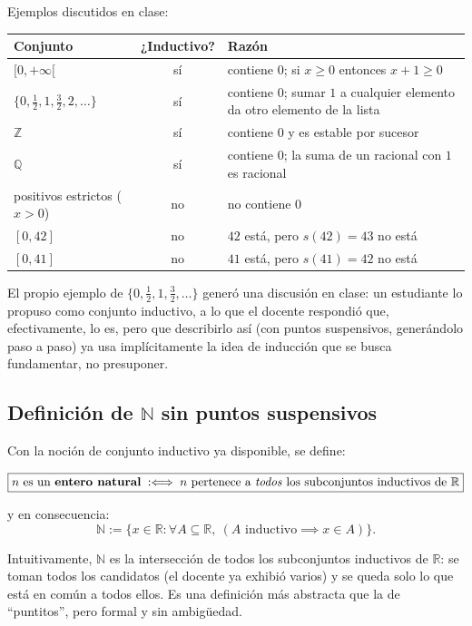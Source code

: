 \documentclass[12pt,a4paper]{article}
\begin{document}
Ejemplos discutidos en clase:

\begin{table}[H]
\centering
\begin{tabularx}{\textwidth}{@{}lcX@{}}
\toprule
Conjunto & ¿Inductivo? & Razón \\
\midrule
$[0,+\infty[$ & sí & contiene $0$; si $x\geq 0$ entonces $x+1\geq 0$ \\
$\{0,\tfrac12,1,\tfrac32,2,\ldots\}$ & sí & contiene $0$; sumar $1$ a cualquier elemento da otro elemento de la lista \\
$\mathbb{Z}$ & sí & contiene $0$ y es estable por sucesor \\
$\mathbb{Q}$ & sí & contiene $0$; la suma de un racional con $1$ es racional \\
positivos estrictos ($x>0$) & no & no contiene $0$ \\
$[0,42]$ & no & $42$ está, pero $s(42)=43$ no está \\
$[0,41]$ & no & $41$ está, pero $s(41)=42$ no está \\
\bottomrule
\end{tabularx}
\end{table}

\begin{notebox}
El propio ejemplo de $\{0,\tfrac12,1,\tfrac32,\ldots\}$ generó una
discusión en clase: un estudiante lo propuso como conjunto inductivo, a lo
que el docente respondió que, efectivamente, lo es, pero que describirlo
así (con puntos suspensivos, generándolo paso a paso) ya usa implícitamente
la idea de inducción que se busca fundamentar, no presuponer.
\end{notebox}

\subsection{Definición de $\mathbb{N}$ sin puntos suspensivos}

Con la noción de conjunto inductivo ya disponible, se define:

$$
\boxed{n \text{ es un \textbf{entero natural}} \;:\Longleftrightarrow\; n \text{ pertenece a \emph{todos} los subconjuntos inductivos de } \mathbb{R}}
$$

y en consecuencia:
$$
\mathbb{N} := \{x \in \mathbb{R} : \forall A \subseteq \mathbb{R},\ (A \text{ inductivo} \implies x \in A)\}.
$$

Intuitivamente, $\mathbb{N}$ es la intersección de todos los subconjuntos
inductivos de $\mathbb{R}$: se toman todos los candidatos (el docente ya
exhibió varios) y se queda solo lo que está en común a todos ellos. Es una
definición más abstracta que la de ``puntitos'', pero formal y sin
ambigüedad.
\end{document}
